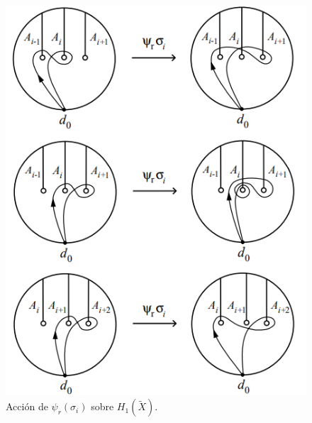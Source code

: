 \documentclass[TFG.tex]{subfiles}
\begin{document}





\begin{figure}[h!]
\includegraphics[scale=0.7]{Imagenes/Burau}
\caption{Acción de $\psi_r(\sigma_i)$ sobre $H_1(\widetilde{X})$.}\label{representacion}
\end{figure}
\end{document}
